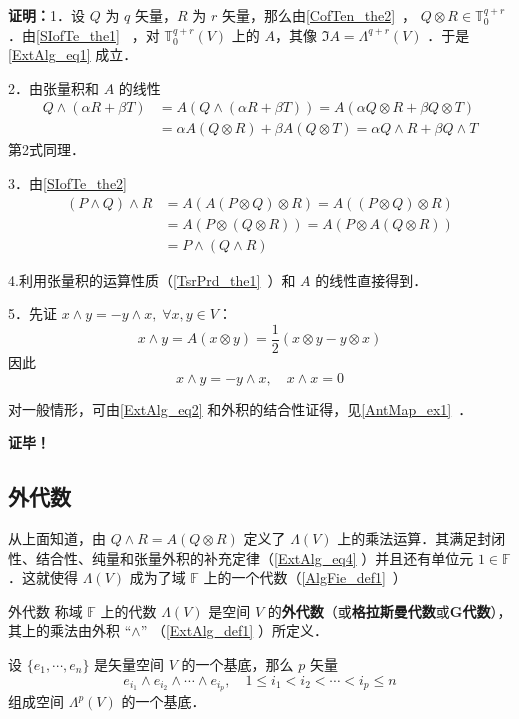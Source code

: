 \textbf{证明：}1．设 $Q$ 为 $q$ 矢量，$R$ 为 $r$ 矢量，那么由\autoref{CofTen_the2}~， $Q\otimes R\in\mathbb T_0^{q+r}$ ．由\autoref{SIofTe_the1}~ ，对 $\mathbb T_0^{q+r}(V)$ 上的 $A$，其像 $\Im A=\Lambda ^{q+r}(V)$ ．于是\autoref{ExtAlg_eq1} 成立．

2．由张量积和 $A$ 的线性
\begin{equation}
\begin{aligned}
Q\wedge(\alpha R+\beta T)&=A(Q\wedge(\alpha R+\beta T))=A(\alpha Q\otimes R+\beta Q\otimes T)\\
&=\alpha A(Q\otimes R)+\beta A(Q\otimes T)=\alpha Q\wedge R+\beta Q\wedge T
\end{aligned}
\end{equation}
第2式同理．

3．由\autoref{SIofTe_the2}~
\begin{equation}
\begin{aligned}
(P\wedge Q)\wedge R&=A(A(P\otimes Q)\otimes R)=A((P\otimes Q)\otimes R)\\
&=A(P\otimes (Q\otimes R))=A(P\otimes A(Q\otimes R))\\
&=P\wedge (Q\wedge R)
\end{aligned}
\end{equation}

4.利用张量积的运算性质（\autoref{TsrPrd_the1}~）和 $A$ 的线性直接得到．

5．先证 $x\wedge y=-y\wedge x,\;\forall x,y\in V$：
\begin{equation}
x\wedge y=A(x\otimes y)=\frac{1}{2}(x\otimes y-y\otimes x)
\end{equation}
因此
\begin{equation}\label{ExtAlg_eq2}
x\wedge y=-y\wedge x,\quad x\wedge x=0
\end{equation}

对一般情形，可由\autoref{ExtAlg_eq2} 和外积的结合性证得，见\autoref{AntMap_ex1}~．

\textbf{证毕！}

\subsection{外代数}

从上面知道，由 $Q \wedge R=A(Q\otimes R)$ 定义了 $\Lambda(V)$ 上的乘法运算．其满足封闭性、结合性、纯量和张量外积的补充定律（\autoref{ExtAlg_eq4} ）并且还有单位元 $1\in\mathbb F$．这就使得 $\Lambda(V)$ 成为了域 $\mathbb F$ 上的一个代数（\autoref{AlgFie_def1}~）
\begin{definition}{外代数}
称域 $\mathbb F$ 上的代数 $\Lambda(V)$ 是空间 $V$ 的\textbf{外代数}（或\textbf{格拉斯曼代数}或\textbf{G代数}），其上的乘法由外积 “$\wedge$” （\autoref{ExtAlg_def1} ）所定义．
\end{definition}
\begin{theorem}{}
设 $\{e_1,\cdots,e_n\}$ 是矢量空间 $V$ 的一个基底，那么 $p$ 矢量
\begin{equation}
e_{i_1}\wedge e_{i_2}\wedge\cdots\wedge e_{i_p},\quad 1\leq i_1<i_2<\cdots<i_p\leq n
\end{equation}
组成空间 $\Lambda^p(V)$ 的一个基底．
\end{theorem}

